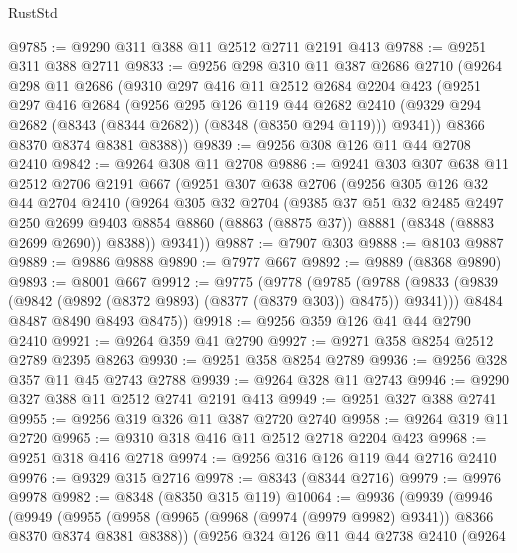 \begin{lexlean}{RustStd}
\begin{coremodule}
{\begin{coremodule}
{{{{{{{{{{{{{{{{{{{{{{{{{{{{{{{{{{{{{{{{{{{{{{{{{{@9785 := @9290 @311 @388 @11 @2512 @2711 @2191 @413
@9788 := @9251 @311 @388 @2711
@9833 := @9256
    @298
    @310
    @11
    @387
    @2686
    @2710
    (@9264
      @298
      @11
      @2686
      (@9310
        @297
        @416
        @11
        @2512
        @2684
        @2204
        @423
        (@9251
          @297
          @416
          @2684
          (@9256
            @295
            @126
            @119
            @44
            @2682
            @2410
            (@9329 @294 @2682 (@8343 (@8344 @2682)) (@8348 (@8350 @294 @119)))
            @9341))
        @8366
        @8370
        @8374
        @8381
        @8388))
@9839 := @9256 @308 @126 @11 @44 @2708 @2410
@9842 := @9264 @308 @11 @2708
@9886 := @9241
    @303
    @307
    @638
    @11
    @2512
    @2706
    @2191
    @667
    (@9251
      @307
      @638
      @2706
      (@9256
        @305
        @126
        @32
        @44
        @2704
        @2410
        (@9264
          @305
          @32
          @2704
          (@9385
            @37
            @51
            @32
            @2485
            @2497
            @250
            @2699
            @9403
            @8854
            @8860
            (@8863 (@8875 @37))
            @8881
            (@8348 (@8883 @2699 @2690))
            @8388))
        @9341))
@9887 := @7907 @303
@9888 := @8103 @9887
@9889 := @9886 @9888
@9890 := @7977 @667
@9892 := @9889 (@8368 @9890)
@9893 := @8001 @667
@9912 := @9775
    (@9778
      (@9785
        (@9788 (@9833 (@9839 (@9842 (@9892 (@8372 @9893) (@8377 (@8379 @303)) @8475)) @9341)))
        @8484
        @8487
        @8490
        @8493
        @8475))
@9918 := @9256 @359 @126 @41 @44 @2790 @2410
@9921 := @9264 @359 @41 @2790
@9927 := @9271 @358 @8254 @2512 @2789 @2395 @8263
@9930 := @9251 @358 @8254 @2789
@9936 := @9256 @328 @357 @11 @45 @2743 @2788
@9939 := @9264 @328 @11 @2743
@9946 := @9290 @327 @388 @11 @2512 @2741 @2191 @413
@9949 := @9251 @327 @388 @2741
@9955 := @9256 @319 @326 @11 @387 @2720 @2740
@9958 := @9264 @319 @11 @2720
@9965 := @9310 @318 @416 @11 @2512 @2718 @2204 @423
@9968 := @9251 @318 @416 @2718
@9974 := @9256 @316 @126 @119 @44 @2716 @2410
@9976 := @9329 @315 @2716
@9978 := @8343 (@8344 @2716)
@9979 := @9976 @9978
@9982 := @8348 (@8350 @315 @119)
@10064 := @9936
    (@9939
      (@9946
        (@9949
          (@9955
            (@9958 (@9965 (@9968 (@9974 (@9979 @9982) @9341)) @8366 @8370 @8374 @8381 @8388))
            (@9256
              @324
              @126
              @11
              @44
              @2738
              @2410
              (@9264
}}}}}}}}}}}}}}}}}}}}}}}}}}}}}}}}}}}}}}}}}}}}}}}}}}
\end{coremodule}}
\end{coremodule}
\end{lexlean}
